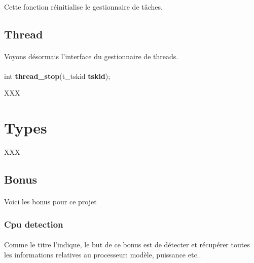 \documentclass[10pt,a4wide]{article}
\begin{document}
\paragraph{}

Cette fonction r\'einitialise le gestionnaire de t\^aches.

\subsection{Thread}

\paragraph{}

Voyons d\'esormais l'interface du gestionnaire de threads.

\paragraph{}

\hspace{1.5cm}int \textbf{thread\_stop}(t\_tskid \textbf{tskid});

XXX

\section{Types}

XXX

\subsection{Bonus}

\paragraph{}

Voici les bonus pour ce projet

\subsubsection{Cpu detection}

\paragraph{}

Comme le titre l'indique, le but de ce bonus est de d\'etecter et r\'ecup\'erer
toutes les informations relatives au processeur: mod\`ele, puissance etc..
\end{document}
